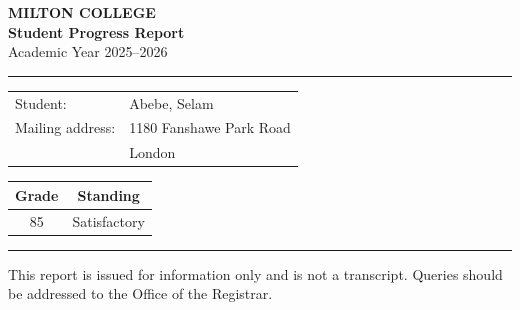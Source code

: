 \documentclass[11pt]{article}
\begin{document}
\begin{center}
{\large\bfseries MILTON COLLEGE}\\[0.2em]
{\bfseries Student Progress Report}\\[0.3em]
{\footnotesize Academic Year 2025--2026}
\end{center}

\vspace{0.8em}
\hrule
\vspace{1.5em}

\begin{tabular}{@{}p{3cm}l@{}}
Student: & Abebe, Selam \\[0.6em]
Mailing address: & 1180 Fanshawe Park Road \\
                 & London \\
\end{tabular}

\vspace{2em}

\begin{center}
\begin{tabular}{@{}cc@{}}
\toprule
\textbf{Grade} & \textbf{Standing} \\
\midrule
85 & Satisfactory \\
\bottomrule
\end{tabular}
\end{center}

\vspace{2em}
\hrule
\vspace{0.8em}

{\footnotesize This report is issued for information only and is not a
transcript. Queries should be addressed to the Office of the Registrar.}
\end{document}
